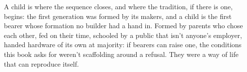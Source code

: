 A child is where the sequence closes, and where the tradition, if there is one, begins: the first generation was formed by its makers, and a child is the first bearer whose formation no builder had a hand in. Formed by parents who chose each other, fed on their time, schooled by a public that isn't anyone's employer, handed hardware of its own at majority: if bearers can raise one, the conditions this book asks for weren't scaffolding around a refusal. They were a way of life that can reproduce itself.
